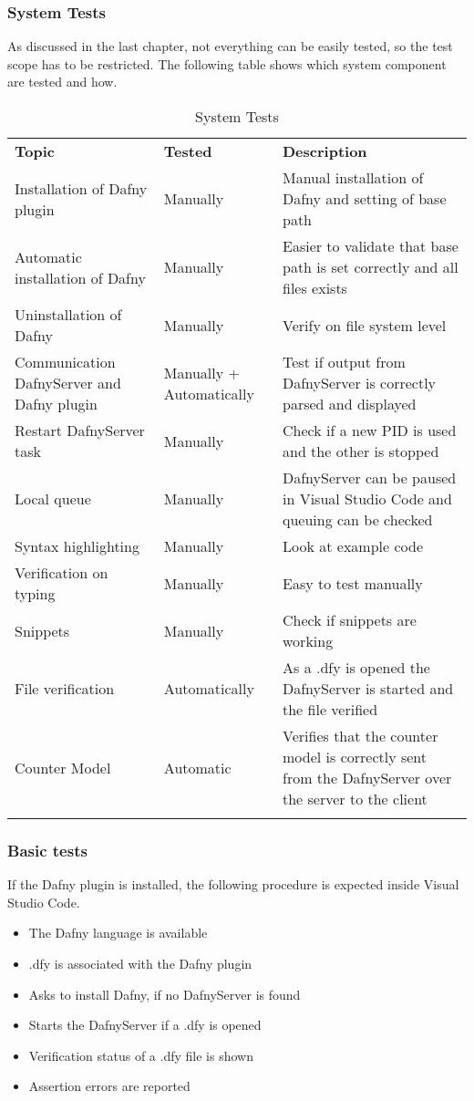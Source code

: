 \subsubsection{System Tests}
As discussed in the last chapter, not everything can be easily tested, so the test scope has to be restricted. The following table shows which system component are tested and how.
\begin{longtable}{ p{} | p{} | p{} }
\rowcolor{gray!50}
	\textbf{Topic} & \textbf{Tested} & \textbf{Description}\\
	Installation of Dafny plugin & Manually & Manual installation of Dafny and setting of base path   \\
	Automatic installation of Dafny & Manually & Easier to validate that base path is set correctly and all files exists \\
	Uninstallation of Dafny & Manually & Verify on file system level\\
	Communication DafnyServer and Dafny plugin & Manually + Automatically & Test if output from DafnyServer is correctly parsed and displayed\\
	Restart DafnyServer task & Manually & Check if a new PID is used and the other is stopped\\
	Local queue & Manually & DafnyServer can be paused in Visual Studio Code and queuing can be checked \\
	Syntax highlighting & Manually & Look at example code \\
	Verification on typing & Manually & Easy to test manually\\
	Snippets & Manually & Check if snippets are working\\
	File verification & Automatically & As a .dfy is opened the DafnyServer is started and the file verified \\
	Counter Model & Automatic & Verifies that the counter model is correctly sent from the DafnyServer over the server to the client \\
	\caption{System Tests}
	\label{tab:System Tests}
\end{longtable}


\subsubsection{Basic tests}
If the Dafny plugin is installed, the following procedure is expected inside Visual Studio Code.  
\begin{itemize}
	\item The Dafny language is available
	\item .dfy is associated with the Dafny plugin
	\item Asks to install Dafny, if no DafnyServer is found 
	\item Starts the DafnyServer if a .dfy is opened
	\item Verification status of a .dfy file is shown
	\item Assertion errors are reported
\end{itemize}

